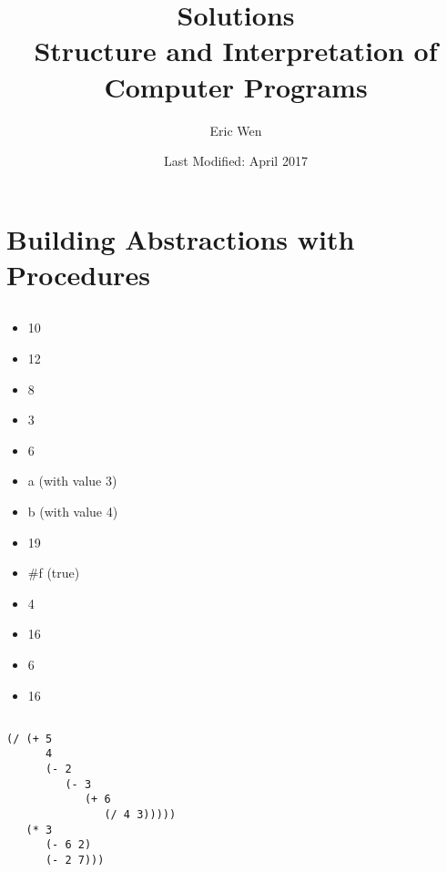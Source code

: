 \documentclass[a4paper]{report}
\begin{document}
\title{Solutions \\
\large Structure and Interpretation of Computer Programs}
\author{Eric Wen}
\date{Last Modified: April 2017}
\maketitle

\begin{multicols}{2}
  \tableofcontents
\end{multicols}

%
%

\chapter{Building Abstractions with Procedures}


\section{}

\begin{multicols}{2}
  \begin{itemize}
    \item 10
    \item 12
    \item 8
    \item 3
    \item 6
    \item a (with value 3)
    \item b (with value 4)
    \item 19
    \item \#f (true)
    \item 4
    \item 16
    \item 6
    \item 16
  \end{itemize}
\end{multicols}


\section{}

\begin{lstlisting}
(/ (+ 5
      4
      (- 2
         (- 3
            (+ 6
               (/ 4 3)))))
   (* 3
      (- 6 2)
      (- 2 7)))
\end{lstlisting}
\end{document}
